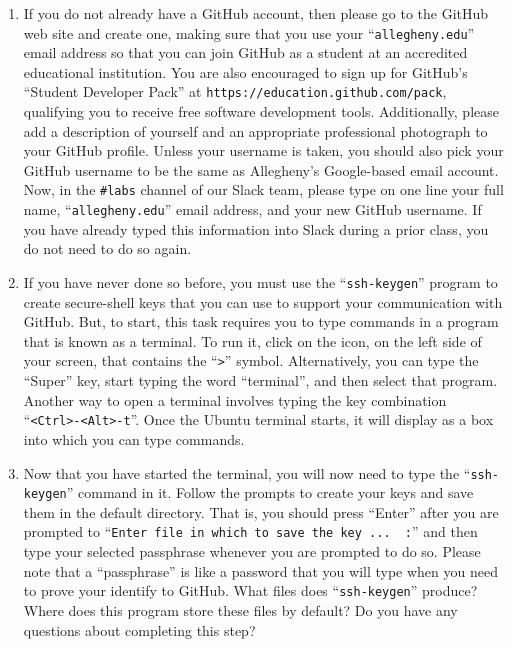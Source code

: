 \documentclass[11pt]{article}
\newcommand{\command}[1]{``\lstinline{#1}''}
\newcommand{\url}[1]{\lstinline{#1}}
\newcommand{\channel}[1]{\lstinline{#1}}
\begin{document}
\begin{enumerate}

  \itemsep 0in

  \item If you do not already have a GitHub account, then please go to the GitHub web site and create one, making sure
    that you use your \command{allegheny.edu} email address so that you can join GitHub as a student at an accredited
    educational institution. You are also encouraged to sign up for GitHub's ``Student Developer Pack'' at
    \url{https://education.github.com/pack}, qualifying you to receive free software development tools. Additionally,
    please add a description of yourself and an appropriate professional photograph to your GitHub profile. Unless your
    username is taken, you should also pick your GitHub username to be the same as Allegheny's Google-based email
    account. Now, in the \channel{#labs} channel of our Slack team, please type on one line your full name,
    \command{allegheny.edu} email address, and your new GitHub username. If you have already typed this information into
    Slack during a prior class, you do not need to do so again.

  \item If you have never done so before, you must use the \command{ssh-keygen} program to create secure-shell keys that
    you can use to support your communication with GitHub. But, to start, this task requires you to type commands in a
    program that is known as a terminal. To run it, click on the icon, on the left side of your screen, that contains
    the \command{>} symbol. Alternatively, you can type the ``Super'' key, start typing the word ``terminal'', and then
    select that program. Another way to open a terminal involves typing the key combination \command{<Ctrl>-<Alt>-t}.
    Once the Ubuntu terminal starts, it will display as a box into which you can type commands.

  \item Now that you have started the terminal, you will now need to type the \command{ssh-keygen} command in it. Follow
    the prompts to create your keys and save them in the default directory. That is, you should press ``Enter'' after
    you are prompted to \command{Enter file in which to save the key ...  :} and then type your selected passphrase
    whenever you are prompted to do so. Please note that a ``passphrase'' is like a password that you will type when you
    need to prove your identify to GitHub. What files does \command{ssh-keygen} produce? Where does this program store
    these files by default? Do you have any questions about completing this step?


\end{enumerate}
\end{document}
